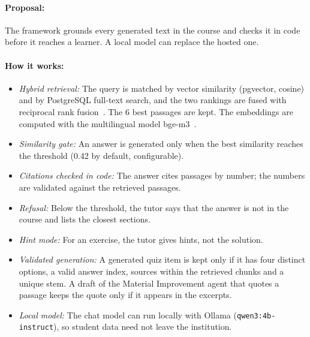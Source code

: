 \paragraph{Proposal:} The framework grounds every generated text in the
course and checks it in code before it reaches a learner. A local model
can replace the hosted one.

\paragraph{How it works:}
\begin{itemize}
  \item \emph{Hybrid retrieval:} The query is matched by vector similarity
        (pgvector, cosine) and by PostgreSQL full-text search, and the two
        rankings are fused with reciprocal rank fusion~\cite{cormack2009rrf}.
        The 6 best passages are kept. The embeddings are computed with the
        multilingual model bge-m3~\cite{chen2024bgem3}.
  \item \emph{Similarity gate:} An answer is generated only when the best
        similarity reaches the threshold (0.42 by default, configurable).
  \item \emph{Citations checked in code:} The answer cites passages by
        number; the numbers are validated against the retrieved passages.
  \item \emph{Refusal:} Below the threshold, the tutor says that the
        answer is not in the course and lists the closest sections.
  \item \emph{Hint mode:} For an exercise, the tutor gives hints, not the
        solution.
  \item \emph{Validated generation:} A generated quiz item is kept only if
        it has four distinct options, a valid answer index, sources within
        the retrieved chunks and a unique stem. A draft of the Material
        Improvement agent that quotes a passage keeps the quote only if it
        appears in the excerpts.
  \item \emph{Local model:} The chat model can run locally with Ollama
        (\texttt{qwen3:4b-instruct}), so student data need not leave the
        institution.
\end{itemize}

